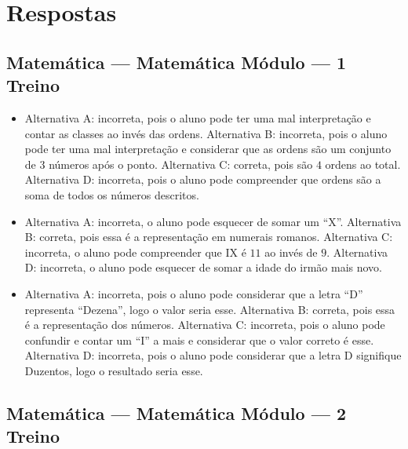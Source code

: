 
\chapter{Respostas}

\footnotesize

\pagecolor{gray!40}

\section*{Matemática — Matemática Módulo — 1 Treino}

\begin{itemize}


\item Alternativa A: incorreta, pois o aluno pode ter uma mal interpretação e
contar as classes ao invés das ordens.
Alternativa B: incorreta, pois o aluno pode ter uma mal interpretação e
considerar que as ordens são um conjunto de $3$ números após o ponto.
Alternativa C: correta, pois são $4$ ordens ao total.
Alternativa D: incorreta, pois o aluno pode compreender que ordens são a
soma de todos os números descritos.

\item Alternativa A: incorreta, o aluno pode esquecer de somar um ``X''.
Alternativa B: correta, pois essa é a representação em numerais romanos.
Alternativa C: incorreta, o aluno pode compreender que IX é $11$ ao invés
de $9$.
Alternativa D: incorreta, o aluno pode esquecer de somar a idade do
irmão mais novo.

\item Alternativa A: incorreta, pois o aluno pode considerar que a letra ``D''
representa ``Dezena'', logo o valor seria esse.
Alternativa B: correta, pois essa é a representação dos números.
Alternativa C: incorreta, pois o aluno pode confundir e contar um ``I''
a mais e considerar que o valor correto é esse.
Alternativa D: incorreta, pois o aluno pode considerar que a letra D
signifique Duzentos, logo o resultado seria esse.
\end{itemize}

\section*{Matemática — Matemática Módulo — 2 Treino}

